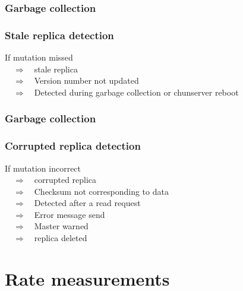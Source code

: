 \documentclass{beamer}
\begin{document}
\begin{frame}
 \frametitle{Garbage collection}
 \frametitle{Stale replica detection}
 If mutation missed\\
 ~~$\Rightarrow$~~stale replica\\
 ~~$\Rightarrow$~~Version number not updated\\
 ~~$\Rightarrow$~~Detected during garbage collection or chunserver reboot
\end{frame}

\begin{frame}
 \frametitle{Garbage collection}
 \frametitle{Corrupted replica detection}
 If mutation incorrect\\
 ~~$\Rightarrow$~~corrupted replica\\
 ~~$\Rightarrow$~~Checksum not corresponding to data\\
 ~~$\Rightarrow$~~Detected after a read request\\
 ~~$\Rightarrow$~~Error message send\\
 ~~$\Rightarrow$~~Master warned\\
 ~~$\Rightarrow$~~replica deleted
\end{frame}

\section{Rate measurements}
\end{document}

